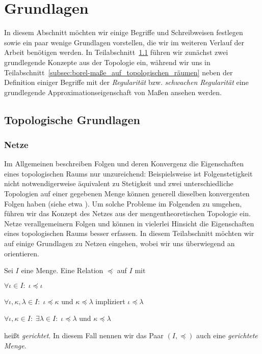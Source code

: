 \documentclass[../thesis/thesis.tex]{subfiles}
\begin{document}
	
	\chapter{Grundlagen}
	
	In diesem Abschnitt möchten wir einige Begriffe und Schreibweisen festlegen sowie ein paar wenige Grundlagen vorstellen, 
	die wir im weiteren Verlauf der Arbeit benötigen werden. 
	In Teilabschnitt~\ref{subsec:topologische_grundlagen} führen wir zunächst zwei grundlegende Konzepte aus der Topologie ein, während wir
	uns in Teilabschnitt~\ref{subsec:borel-maße_auf_topologischen_räumen} neben der Definition einiger Begriffe mit der 
	\emph{Regularität} bzw. \emph{schwachen Regularität} eine grundlegende Approximationseigenschaft von Maßen ansehen werden.
	
	\section{Topologische Grundlagen}
	\label{subsec:topologische_grundlagen}
	
	\subsection*{Netze}
	
	Im Allgemeinen beschreiben Folgen und deren Konvergenz die Eigenschaften eines topologischen Raums nur unzureichend:
	Beispielsweise ist Folgenstetigkeit nicht notwendigerweise äquivalent zu Stetigkeit und zwei unterschiedliche Topologien auf einer 
	gegebenen Menge können generell dieselben konvergenten Folgen haben (siehe etwa \cite[Beispiel 2.6.1]{Simon.2015}). 
	Um solche Probleme im Folgenden zu umgehen, führen wir das
	Konzept des Netzes aus der mengentheoretischen Topologie ein. Netze verallgemeinern Folgen und können in vielerlei Hinsicht die 
	Eigenschaften eines topologischen Raums besser erfassen. In diesem Teilabschnitt möchten wir auf einige Grundlagen zu Netzen eingehen,
	wobei wir uns überwiegend an \cite[Kapitel 2.6]{Simon.2015} orientieren.
	
	\begin{Definition}
		\label{def:gerichtete_menge}
		Sei $I$ eine Menge. Eine Relation $\preceq$ auf $I$ mit
		\begin{enumeratethm}
			\item $\forall \iota \in I: \; \iota \preceq \iota$
			\item $\forall \iota, \kappa, \lambda \in I: \; \iota \preceq \kappa$ und $\kappa \preceq \lambda$ impliziert $\iota \preceq \lambda$
			\item $\forall \iota, \kappa \in I: \; \exists \lambda \in I: \; \iota \preceq \lambda$ und $\kappa \preceq \lambda$
		\end{enumeratethm}
		heißt \emph{gerichtet}. In diesem Fall nennen wir das Paar $(I, \preceq)$ auch eine \emph{gerichtete Menge}.
	\end{Definition}
	
\end{document}

